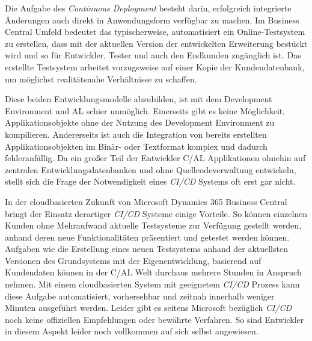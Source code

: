 Die Aufgabe des \textit{Continuous Deployment} besteht darin, erfolgreich integrierte Änderungen auch direkt in Anwendungsform verfügbar zu machen. Im Business Central Umfeld bedeutet das typischerweise, automatisiert ein Online-Testsystem zu erstellen, dass mit der aktuellen Version der entwickelten Erweiterung bestückt wird und so für Entwickler, Tester und auch den Endkunden zugänglich ist. Das erstellte Testsystem arbeitet vorzugsweise auf einer Kopie der Kundendatenbank, um möglichst realitätsnahe Verhältnisse zu schaffen.

Diese beiden Entwicklungsmodelle abzubilden, ist mit dem Development Environment und AL schier unmöglich. Einerseits gibt es keine Möglichkeit, Applikationsobjekte ohne der Nutzung des Development Environment zu kompilieren. Andererseits ist auch die Integration von bereits erstellten Applikationsobjekten im Binär- oder Textformat komplex und dadurch fehleranfällig. Da ein großer Teil der Entwickler C/AL Applikationen ohnehin auf zentralen Entwicklungsdatenbanken und ohne Quellcodeverwaltung entwickeln, stellt sich die Frage der Notwendigkeit eines \textit{CI/CD} Systems oft erst gar nicht. 

In der cloudbasierten Zukunft von Microsoft Dynamics 365 Business Central bringt der Einsatz derartiger \textit{CI/CD} Systeme einige Vorteile. So können einzelnen Kunden ohne Mehraufwand aktuelle Testsysteme zur Verfügung gestellt werden, anhand deren neue Funktionalitäten präsentiert und getestet werden können. Aufgaben wie die Erstellung eines neuen Testsystems anhand der aktuellsten Versionen des Grundsystems mit der Eigenentwicklung, basierend auf Kundendaten können in der C/AL Welt durchaus mehrere Stunden in Anspruch nehmen. Mit einem cloudbasierten System mit geeignetem \textit{CI/CD} Prozess kann diese Aufgabe automatisiert, vorhersehbar und zeitnah innerhalb weniger Minuten ausgeführt werden. Leider gibt es seitens Microsoft bezüglich \textit{CI/CD} noch keine offiziellen Empfehlungen oder bewährte Verfahren. So sind Entwickler in diesem Aspekt leider noch vollkommen auf sich selbst angewiesen. 




